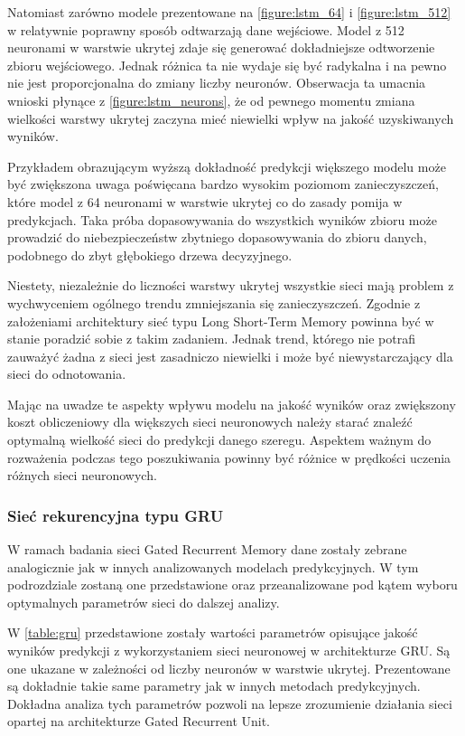 \documentclass[10pt,a4paper]{article}
\begin{document}
Natomiast zarówno modele prezentowane na \autoref{figure:lstm_64} i \autoref{figure:lstm_512} w relatywnie poprawny sposób odtwarzają dane wejściowe. Model z 512 neuronami w warstwie ukrytej zdaje się generować dokładniejsze odtworzenie zbioru wejściowego. Jednak różnica ta nie wydaje się być radykalna i na pewno nie jest proporcjonalna do zmiany liczby neuronów. Obserwacja ta umacnia wnioski płynące z \autoref{figure:lstm_neurons}, że od pewnego momentu zmiana wielkości warstwy ukrytej zaczyna mieć niewielki wpływ na jakość uzyskiwanych wyników. 

Przykładem obrazującym wyższą dokładność predykcji większego modelu może być zwiększona uwaga poświęcana bardzo wysokim poziomom zanieczyszczeń, które model z 64 neuronami w warstwie ukrytej co do zasady pomija w predykcjach. Taka próba dopasowywania do wszystkich wyników zbioru może prowadzić do niebezpieczeństw zbytniego dopasowywania do zbioru danych, podobnego do zbyt głębokiego drzewa decyzyjnego.

Niestety, niezależnie do liczności warstwy ukrytej wszystkie sieci mają problem z wychwyceniem ogólnego trendu zmniejszania się zanieczyszczeń. Zgodnie z założeniami architektury sieć typu Long Short-Term Memory powinna być w stanie poradzić sobie z takim zadaniem. Jednak trend, którego nie potrafi zauważyć żadna z sieci jest zasadniczo niewielki i może być niewystarczający dla sieci do odnotowania. 

Mając na uwadze te aspekty wpływu modelu na jakość wyników oraz zwiększony koszt obliczeniowy dla większych sieci neuronowych należy starać znaleźć optymalną wielkość sieci do predykcji danego szeregu. Aspektem ważnym do rozważenia podczas tego poszukiwania powinny być różnice w prędkości uczenia różnych sieci neuronowych.

\subsubsection{Sieć rekurencyjna typu GRU}
W ramach badania sieci Gated Recurrent Memory dane zostały zebrane analogicznie jak w innych analizowanych modelach predykcyjnych. W tym podrozdziale zostaną one przedstawione oraz przeanalizowane pod kątem wyboru optymalnych parametrów sieci do dalszej analizy. 

W \autoref{table:gru} przedstawione zostały wartości parametrów opisujące jakość wyników predykcji z wykorzystaniem sieci neuronowej w architekturze GRU. Są one ukazane w zależności od liczby neuronów w warstwie ukrytej. Prezentowane są dokładnie takie same parametry jak w innych metodach predykcyjnych. Dokładna analiza tych parametrów pozwoli na lepsze zrozumienie działania sieci opartej na architekturze Gated Recurrent Unit. 
\end{document}
